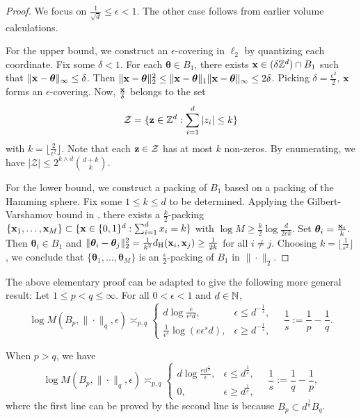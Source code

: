\begin{proof}
    We focus on $\frac{1}{\sqrt{d}}\leq \epsilon<1$. The other case follows from earlier volume calculations.

    For the upper bound, we construct an $\epsilon$-covering in $\ell_2$ by quantizing each coordinate.
    Fix some $\delta<1$. For each $\bm\theta\in B_1$, there exists $\mathbf{x}\in (\delta\mathbb{Z}^d)\cap B_1$ such that $\|\mathbf{x}-\bm\theta\|_\infty\leq \delta$.
    Then $\|\mathbf{x}-\bm\theta\|_2^2\leq \|\mathbf{x}-\bm\theta\|_1\|\mathbf{x}-\bm\theta\|_\infty\leq 2\delta$. Picking $\delta=\frac{\epsilon^2}{2}$, $\mathbf{x}$ forms an $\epsilon$-covering.
    Now, $\frac{\mathbf{x}}{\delta}$ belongs to the set \[\mathcal{Z}=\{\mathbf{z}\in\mathbb{Z}^d:\sum_{i=1}^{d}|z_i|\leq k\}\]
    with $k=\lfloor\frac{2}{\epsilon^2}\rfloor$. Note that each $\mathbf{z}\in\mathcal{Z}$ has at most $k$ non-zeros.
    By enumerating, we have $|\mathcal{Z}|\leq 2^{k\wedge d}{d+k\choose{k}}$.

    For the lower bound, we construct a packing of $B_1$ based on a packing of the Hamming sphere.
    Fix some $1\leq k\leq d$ to be determined. Applying the Gilbert-Varshamov bound in , there exists a $\frac{k}{2}$-packing $\{\mathbf{x}_1,\dots,\mathbf{x}_M\}\subset \{\mathbf{x}\in\{0,1\}^d:\sum_{i=1}^{d}x_i=k\}$ with $\log M\geq \frac{k}{2}\log\frac{d}{2ek}$.
    Set $\bm\theta_i=\frac{\mathbf{x}_i}{k}$. Then $\bm\theta_i\in B_1$ and $\|\bm\theta_i-\bm\theta_j\|_2^2=\frac{1}{k^2}d_{\rm H}(\mathbf{x}_i,\mathbf{x}_j)\geq \frac{1}{2k}$ for all $i\neq j$.
    Choosing $k=\lfloor\frac{1}{\epsilon^2}\rfloor$, we conclude that $\{\bm\theta_1,\dots,\bm\theta_M\}$ is an $\frac{\epsilon}{2}$-packing of $B_1$ in $\|\cdot\|_2$.
\end{proof}
\begin{remark}
The above elementary proof can be adapted to give the following more general result: Let $1\leq p<q\leq\infty$.
For all $0<\epsilon<1$ and $d\in\mathbb{N}$, 
\[\log M(B_p,\|\cdot\|_q,\epsilon)\asymp_{p,q} \begin{cases}
d\log\frac{e}{\epsilon^s d}, &\epsilon \leq d^{-\frac{1}{s}} ,  \\
\frac{1}{\epsilon^s}\log(e\epsilon^s d),&\epsilon \geq d^{-\frac{1}{s}}  ,
\end{cases}\quad \frac{1}{s}:=\frac{1}{p}-\frac{1}{q}.\]
\end{remark}
\begin{remark}
When $p>q$, we have 
\[\log M(B_p,\|\cdot\|_q,\epsilon)\asymp_{p,q} \begin{cases}
d\log\frac{e d^{\frac{1}{s}}}{\epsilon }, &\epsilon \leq d^{\frac{1}{s}} ,  \\
0,&\epsilon \geq d^{\frac{1}{s}}  ,
\end{cases}\quad \frac{1}{s}:=\frac{1}{q}-\frac{1}{p},\]
where the first line can be proved by the second line is because $B_p\subset d^{\frac{1}{s}}B_q$.
\end{remark}

